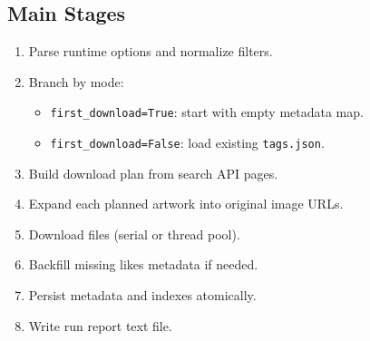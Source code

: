 \documentclass[11pt]{article}
\begin{document}
\subsection{Main Stages}
\begin{enumerate}
    \item Parse runtime options and normalize filters.
    \item Branch by mode:
    \begin{itemize}
        \item \texttt{first\_download=True}: start with empty metadata map.
        \item \texttt{first\_download=False}: load existing \texttt{tags.json}.
    \end{itemize}
    \item Build download plan from search API pages.
    \item Expand each planned artwork into original image URLs.
    \item Download files (serial or thread pool).
    \item Backfill missing likes metadata if needed.
    \item Persist metadata and indexes atomically.
    \item Write run report text file.
\end{enumerate}
\end{document}
